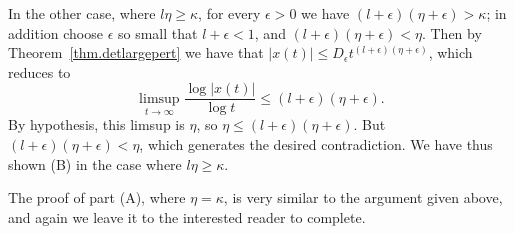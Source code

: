 \documentclass[a4paper,10pt,reqno]{amsart}
\numberwithin{equation}{section}
\newtheorem{corollary}{Corollary}
\theoremstyle{definition}
\theoremstyle{remark}
\DeclareMathOperator{\1}{\mathbbm 1}
\begin{document}
In the other case, where  $l\eta\geq \kappa$, for every $\epsilon>0$ we have  $(l+\epsilon)(\eta+\epsilon)>\kappa$; in addition choose $\epsilon$ so small that $l+\epsilon<1$, and $(l+\epsilon)(\eta+\epsilon)<\eta$. Then by  Theorem~\ref{thm.detlargepert} we have that $|x(t)|\leq D_\epsilon t^{(l+\epsilon)(\eta+\epsilon)}$, which reduces to 
\[
\limsup_{t\to\infty} \frac{\log |x(t)|}{\log t}\leq (l+\epsilon)(\eta+\epsilon).
\]
By hypothesis, this limsup is $\eta$, so 
$\eta\leq  (l+\epsilon)(\eta+\epsilon)$. But $(l+\epsilon)(\eta+\epsilon)<\eta$, which generates the desired contradiction. We have thus shown (B) in the case where $l\eta\geq \kappa$.

The proof of part (A), where $\eta=\kappa$, is very similar to the argument given above, and again we leave it to the interested reader to complete.   

\end{document}
